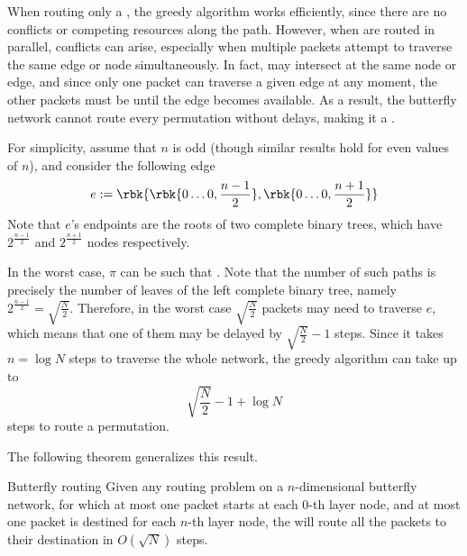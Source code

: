 \documentclass[a4paper, 12pt]{report}
\begin{document}
    When routing only a , the greedy algorithm works efficiently, since there are no conflicts or competing resources along the path. However, when  are routed in parallel, conflicts can arise, especially when multiple packets attempt to traverse the same edge or node simultaneously. In fact,  may intersect at the same node or edge, and since only one packet can traverse a given edge at any moment, the other packets must be  until the edge becomes available. As a result, the butterfly network cannot route every permutation without delays, making it a .

    For simplicity, assume that $n$ is odd (though similar results hold for even values of $n$), and consider the following edge $$e :=  \rbk{ \rbk{0 \ldots 0, \frac{n-1}{2}},  \rbk{ 0 \ldots 0,\frac{n+1}{2} } }$$ Note that $e$'s endpoints are the roots of two complete binary trees, which have $2^{\frac{n -1}{2}}$ and $2^{\frac{n + 1}{2}}$ nodes respectively.


    In the worst case, $\pi$ can be such that . Note that the number of such paths is precisely the number of leaves of the left complete binary tree, namely $2^\frac{n- 1}{2} = \sqrt{\frac{N}{2}}$. Therefore, in the worst case $\sqrt{\frac{N}{2}}$ packets may need to traverse $e$, which means that one of them may be delayed by $\sqrt{\frac{N}{2}} - 1$ steps. Since it takes $n = \log N$ steps to traverse the whole network, the greedy algorithm can take up to $$\sqrt{\dfrac{N}{2}} -1 + \log N$$ steps to route a permutation.

    The following theorem generalizes this result.

    \begin{framedthm}{Butterfly routing}
        Given any routing problem on a $n$-dimensional butterfly network, for which at most one packet starts at each $0$-th layer node, and at most one packet is destined for each $n$-th layer node, the  will route all the packets to their destination in $O (\sqrt N)$ steps.
    \end{framedthm}
\end{document}
